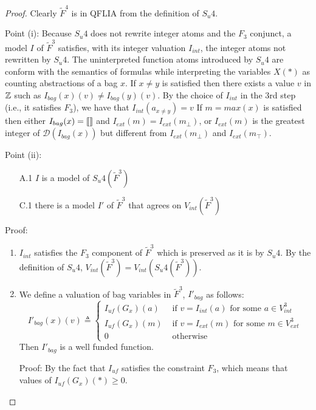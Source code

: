 \begin{proof}
Clearly $\tilde{F}^4$ is in QFLIA from the definition of $S_{u}4$.

Point (i): Because $S_{u}4$ does not rewrite integer atoms and the $F_3$ conjunct, a model $I$ of $\tilde{F}^3$ satisfies, with its integer valuation $I_{int}$, the integer atoms not rewritten by $S_{u}4$.
The uninterpreted function atoms introduced by $S_{u}4$ are conform with the semantics of formulas while interpreting the variables $X(*)$ as counting abstractions of a bag $x$.
If $x \neq y$ is satisfied then there exists a value $v$ in $\mathbb{Z}$ such as $I_{bag}(x)(v) \neq I_{bag}(y)(v)$. By the choice of $I_{int}$ in the 3rd step (i.e., it satisfies $F_3$), we have that $I_{int}(a_{x\neq y}) = v$
If $m = max(x)$ is satisfied then either $I_{bag}(x) = \llbracket  \rrbracket $ and $I_{ext}(m) = I_{ext}(m_{\bot})$, or $I_{ext}(m)$ is the greatest integer of $\mathcal{D}(I_{bag}(x))$ but different from $I_{ext}(m_{\bot})$ and $I_{ext}(m_{\top})$.

Point (ii):
\begin{enumerate}
\item[A.1] $I$ is a model of $S_{u}4(\tilde{F}^3)$
\item[C.1] there is a model $I'$ of $\tilde{F}^3$ that agrees on $V_{int}(\tilde{F}^3)$
\end{enumerate}

Proof:
\begin{enumerate}[1.]
\item %
$I_{int}$ satisfies the $F_3$ component of $\tilde{F}^3$ which is preserved as it is by $S_{u}4$.
By the definition of $S_{u}4$, $V_{int}(\tilde{F}^3) = V_{int}(S_{u}4(\tilde{F}^3))$.

\item %
We define a valuation of bag variables in $\tilde{F}^3$, $I'_{bag}$ as follows:
$$
I'_{bag}(x)(v) \triangleq \left\{\begin{array}{ll}
I_{\textit{uf}}(G_{x})(a) & \mbox{ if } v = I_{int}(a) \mbox{ for some }a\in V^3_{int} \\
I_{\textit{uf}}(G_{x})(m) & \mbox{ if } v = I_{ext}(m) \mbox{ for some }m\in V^3_{ext} \\
0 & \mbox{ otherwise}
\end{array}\right.
$$
Then $I'_{bag}$ is a well funded function.

Proof: By the fact that $I_{\textit{uf}}$ satisfies the constraint $F_3$, which means that values of $I_{\textit{uf}}(G_{x})(*) \ge 0$.


\end{enumerate}
\end{proof}
